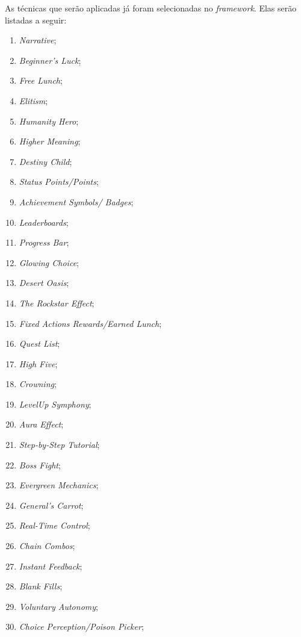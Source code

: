 As técnicas que serão aplicadas já foram selecionadas no \textit{framework}. Elas serão listadas a seguir:

\begin{multicols}{2}
    \begin{enumerate}
        \item \textit{Narrative};
        \item \textit{Beginner's Luck};
        \item \textit{Free Lunch};
        \item \textit{Elitism};
        \item \textit{Humanity Hero};
        \item \textit{Higher Meaning};
        \item \textit{Destiny Child};
        \item \textit{Status Points/Points};
        \item \textit{Achievement Symbols/ Badges};
        \item \textit{Leaderboards};
        \item \textit{Progress Bar};
        \item \textit{Glowing Choice};
        \item \textit{Desert Oasis};
        \item \textit{The Rockstar Effect};
        \item \textit{Fixed Actions Rewards/Earned Lunch};
        \item \textit{Quest List};
        \item \textit{High Five};
        \item \textit{Crowning};
        \item \textit{LevelUp Symphony};
        \item \textit{Aura Effect};
        \item \textit{Step-by-Step Tutorial};
        \item \textit{Boss Fight};
        \item \textit{Evergreen Mechanics};
        \item \textit{General's Carrot};
        \item \textit{Real-Time Control};
        \item \textit{Chain Combos};
        \item \textit{Instant Feedback};
        \item \textit{Blank Fills};
        \item \textit{Voluntary Autonomy};
        \item \textit{Choice Perception/Poison Picker};

\end{enumerate}
\end{multicols}
